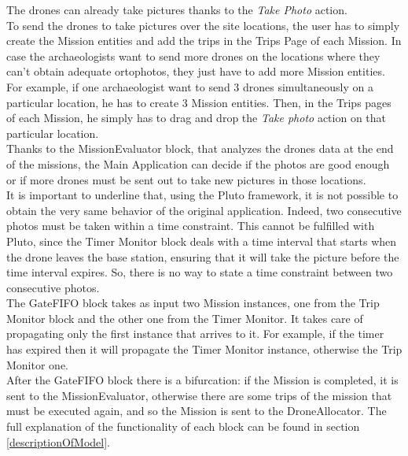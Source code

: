 The drones can already take pictures thanks to the \textit{Take Photo} action.
\\

To send the drones to take pictures over the site locations, the user has to simply create the Mission entities and add the trips in the Trips Page of each Mission.
In case the archaeologists want to send more drones on the locations where they can't obtain adequate ortophotos, they just have to add more Mission entities.
For example, if one archaeologist want to send 3 drones simultaneously on a particular location, he has to create 3 Mission entities.
Then, in the Trips pages of each Mission, he simply has to drag and drop the \textit{Take photo} action on that particular location.
\\

Thanks to the MissionEvaluator block, that analyzes the drones data at the end of the missions, the Main Application can decide if the photos are good enough or if more drones must be sent out to take new pictures in those locations.
\\

It is important to underline that, using the Pluto framework, it is not possible to obtain the very same behavior of the original application.
Indeed, two consecutive photos must be taken within a time constraint.
This cannot be fulfilled with Pluto, since the Timer Monitor block deals with a time interval that starts when the drone leaves the base station, ensuring that it will take the picture before the time interval expires.
So, there is no way to state a time constraint between two consecutive photos.
\\

The GateFIFO block takes as input two Mission instances, one from the Trip Monitor block and the other one from the Timer Monitor.
It takes care of propagating only the first instance that arrives to it.
For example, if the timer has expired then it will propagate the Timer Monitor instance, otherwise the Trip Monitor one.
\\

After the GateFIFO block there is a bifurcation:
if the Mission is completed, it is sent to the MissionEvaluator, otherwise there are some trips of the mission that must be executed again, and so the Mission is sent to the DroneAllocator.
The full explanation of the functionality of each block can be found in section \ref{descriptionOfModel}.
\\



